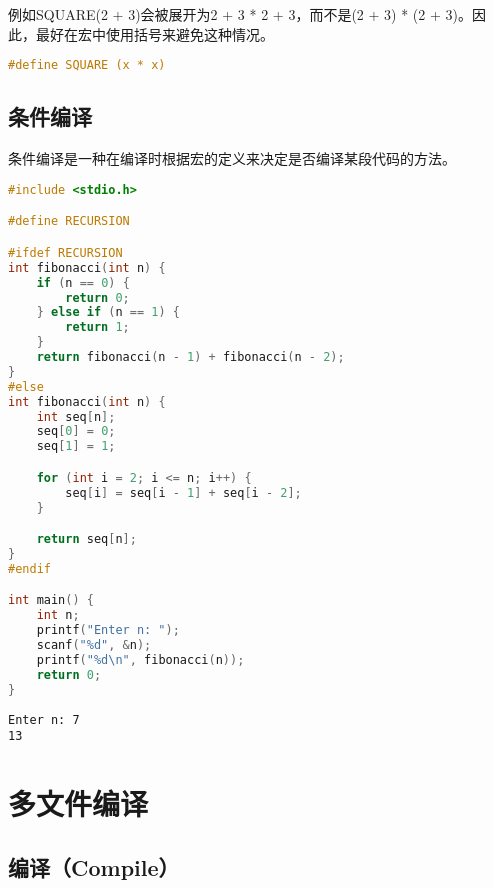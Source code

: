 例如SQUARE(2 + 3)会被展开为2 + 3 * 2 + 3，而不是(2 + 3) * (2 + 3)。因此，最好在宏中使用括号来避免这种情况。

\vspace{-0.5cm}

\begin{lstlisting}[language=C]
#define SQUARE (x * x)
\end{lstlisting}

\vspace{0.5cm}

\subsection{条件编译}

条件编译是一种在编译时根据宏的定义来决定是否编译某段代码的方法。\\


\begin{lstlisting}[language=C]
#include <stdio.h>

#define RECURSION

#ifdef RECURSION
int fibonacci(int n) {
    if (n == 0) {
        return 0;
    } else if (n == 1) {
        return 1;
    }
    return fibonacci(n - 1) + fibonacci(n - 2);
}
#else
int fibonacci(int n) {
    int seq[n];
    seq[0] = 0;
    seq[1] = 1;

    for (int i = 2; i <= n; i++) {
        seq[i] = seq[i - 1] + seq[i - 2];
    }

    return seq[n];
}
#endif

int main() {
    int n;
    printf("Enter n: ");
    scanf("%d", &n);
    printf("%d\n", fibonacci(n));
    return 0;
}
\end{lstlisting}

\begin{tcolorbox}
    \begin{verbatim}
Enter n: 7
13
	\end{verbatim}
\end{tcolorbox}

\newpage

\section{多文件编译}

\subsection{编译（Compile）}

